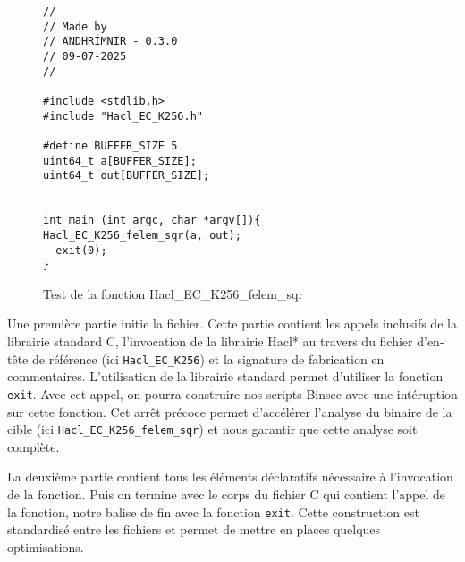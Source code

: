 \begin{figure}[!ht]
  \caption{Test de la fonction Hacl\_EC\_K256\_felem\_sqr}
  \label{fig:gen_test_simple}
  \begin{verbatim}
//
// Made by
// ANDHRÍMNIR - 0.3.0
// 09-07-2025
//

#include <stdlib.h>
#include "Hacl_EC_K256.h"

#define BUFFER_SIZE 5
uint64_t a[BUFFER_SIZE];
uint64_t out[BUFFER_SIZE];


int main (int argc, char *argv[]){
Hacl_EC_K256_felem_sqr(a, out);
  exit(0);
}   
  \end{verbatim}

\end{figure}

Une première partie initie la fichier. Cette partie contient les appels inclusifs de la librairie standard C, l'invocation de la librairie Hacl* au travers du fichier d'en-tête de référence (ici \texttt{Hacl\_EC\_K256}) et la signature de fabrication en commentaires. L'utilisation de la librairie standard permet d'utiliser la fonction \texttt{exit}. Avec cet appel, on pourra construire nos scripts Binsec avec une intéruption sur cette fonction. Cet arrêt précoce permet d'accélérer l'analyse du binaire de la cible (ici \texttt{Hacl\_EC\_K256\_felem\_sqr}) et nous garantir que cette analyse soit complète.\smallbreak

La deuxième partie contient tous les éléments déclaratifs nécessaire à l'invocation de la fonction. Puis on termine avec le corps du fichier C qui contient l'appel de la fonction, notre balise de fin avec la fonction \texttt{exit}. Cette construction est standardisé entre les fichiers et permet de mettre en places quelques optimisations.


